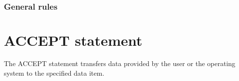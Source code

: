 \subsubsection{General rules}

\section{ACCEPT statement}

The ACCEPT statement transfers data provided by the user or the operating system to the specified data item.

\begin{syntax}
  \begin{1=}
    \identifier \\
  \end{1=}
  \begin{0-1}
     \mnemonicname
  \end{0-1}
  \begin{0-1}
  \end{0-1}
\end{syntax}

